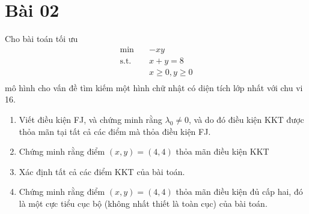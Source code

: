 \section{Bài 02}

Cho bài toán tối ưu
\begin{equation}
    \begin{aligned}
        \min \quad & -xy\\
        \textrm{s.t.} \quad & x + y = 8\\
          &x\geq0, y \geq 0    \\
    \end{aligned}
\end{equation}
mô hình cho vấn đề tìm kiếm một hình chữ nhật có diện tích lớp nhất với chu vi 16.

\begin{enumerate}[label=(\alph*)]
\item Viết điều kiện FJ, và chứng minh rằng $\lambda_0 \ne 0$, và do đó điều kiện KKT được thỏa mãn tại tất cả các điểm mà thỏa điều kiện FJ.
\item Chứng minh rằng điểm $(x,y) = (4,4)$ thỏa mãn điều kiện KKT
\item Xác định tất cả các điểm KKT của bài toán.
\item Chứng minh rằng điểm $(x,y) = (4,4)$ thỏa mãn điều kiện đủ cấp hai, đó là một cực tiểu cục bộ (không nhất thiết là toàn cục) của bài toán. 
\end{enumerate}

